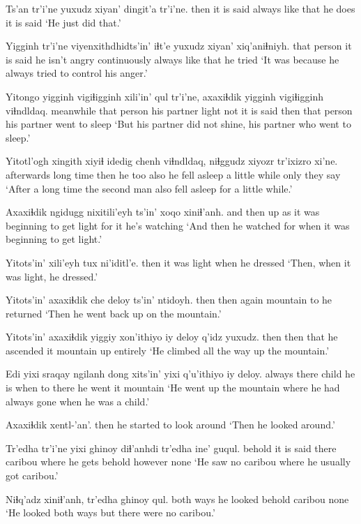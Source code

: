 \documentclass[12pt]{article}
\begin{document}
\gll Ts'an tr'i'ne {yuxudz xiyan'} dingit'a tr'i'ne.
then {it is said} {always like that} {he does} {it is said}
\glt `He just did that.'
\glend

\gll Yigginh tr'i'ne {viyenxithdhidts'in'} iɬt'e {yuxudz xiyan'} xiq'aniɬniyh.
{that person} {it is said} {he isn't angry}  continuously {always like that}  {he tried}
\glt `It was because he always tried to control his anger.'
\glend

\gll Yitongo yigginh vigiɬigginh xili'in' qul tr'i'ne, axaxiɬdik yigginh vigiɬigginh viɬndldaq.
meanwhile {that person} {his partner} light not {it is said} then  {that person} {his partner} {went to sleep}
\glt `But his partner did not shine, his partner who went to sleep.'
\glend

\gll Yitotl'ogh xingith xiyiɬ idedig chenh  viɬndldaq, {niɬggudz xiyozr} tr'ixizro xi'ne.
afterwards {long time} then {he too} also {he fell asleep} {a little while} only  {they say}
\glt `After a long time the second man also fell asleep for a little while.'
\glend

\gll Axaxiɬdik ngidugg {nixitili'eyh ts'in'} xoqo xiniɬ'anh.
{and then} up {as it was beginning to get light} {for it} {he's watching}
\glt `And then he watched for when it was beginning to get light.'
\glend

\gll Yitots'in' xili'eyh tux  ni'iditl'e.
then  {it was light} when {he dressed}
\glt `Then, when it was light, he dressed.'
\glend

\gll Yitots'in' axaxiɬdik che deloy  ts'in' ntidoyh.
then  then  again mountain to {he returned}
\glt `Then he went back up on the mountain.'
\glend

\gll Yitots'in' axaxiɬdik yiggiy xon'ithiyo iy deloy  q'idz yuxudz. 
then  then  that {he ascended} it mountain up entirely 
\glt `He climbed all the way up the mountain.'
\glend

\gll Edi yixi sraqay ngilanh dong xits'in' yixi q'u'ithiyo iy deloy.
always there child {he is} when to there {he went} it mountain
\glt `He went up the mountain where he had always gone when he was a child.'
\glend

\gll Axaxiɬdik xentl-'an'.
then  {he started to look around}
\glt `Then he looked around.'
\glend

\gll Tr'edha tr'i'ne yixi ghinoy  diɬ'anhdi tr'edha ine' guqul.
behold  {it is said} there caribou {where he gets}  behold however none
\glt `He saw no caribou where he usually got caribou.'
\glend

\gll Niɬq'adz xiniɬ'anh, tr'edha ghinoy qul.
{both ways} {he looked} behold  caribou  none
\glt `He looked both ways but there were no caribou.'
\glend
\end{document}
